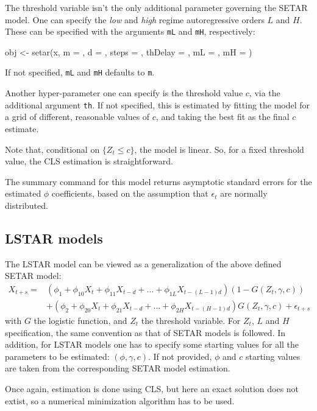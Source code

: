 \documentclass[a4paper]{article}
\begin{document}
The threshold variable isn't the only additional parameter governing the SETAR model. One can specify the \emph{low} and \emph{high} regime autoregressive orders $L$ and $H$. These can be specified with the arguments \texttt{mL} and \texttt{mH}, respectively:
\begin{Schunk}
\begin{Sinput}
 obj <- setar(x, m = , d = , steps = , thDelay = , mL = , mH = )
\end{Sinput}
\end{Schunk}
If not specified, \texttt{mL} and \texttt{mH} defaults to \texttt{m}.

Another hyper-parameter one can specify is the threshold value $c$, via the additional argument \texttt{th}.
If not specified, this is estimated by fitting the model for a grid of different, reasonable values of $c$, and taking the best fit as the final $c$ estimate.

Note that, conditional on $\{Z_t\leq c\}$, the model is linear. So, for a fixed threshold value, the CLS estimation is straightforward.

The summary command for this model returns asymptotic standard errors for the estimated $\phi$ coefficients, based on the assumption that $\epsilon_t$ are normally distributed.

\subsection{LSTAR models}
The LSTAR model can be viewed as a generalization of the above defined SETAR model:
\begin{eqnarray*}
X_{t+s} =& 
( \phi_1 + \phi_{10} X_t + \phi_{11} X_{t-d} + \ldots + \phi_{1L} X_{t-(L-1)d} )
	( 1 - G(Z_t, \gamma, c) ) \\
	 & + ( \phi_2 + \phi_{20} X_t + \phi_{21} X_{t-d} + \ldots + \phi_{2H} X_{t-(H-1)d} )
	 G( Z_t, \gamma, c) + \epsilon_{t+s}
\end{eqnarray*}
with $G$ the logistic function, and $Z_t$ the threshold variable. For $Z_t$, $L$ and $H$ specification, the same convention as that of SETAR models is followed. In addition, for LSTAR models one has to specify some starting values for all the parameters to be estimated: $(\phi, \gamma, c)$.
If not provided, $\phi$ and $c$ starting values are taken from the corresponding SETAR model estimation.

Once again, estimation is done using CLS, but here an exact solution does not extist, so a numerical minimization algorithm has to be used.
\end{document}
